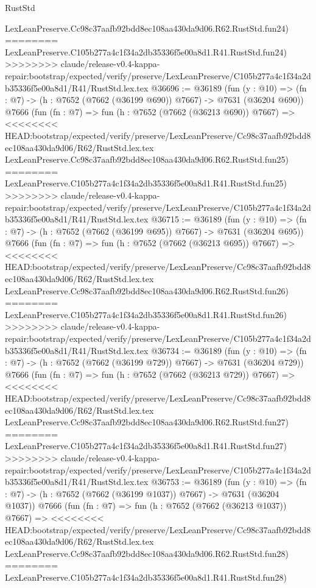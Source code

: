\begin{lexlean}{RustStd}
\begin{coremodule}
{\begin{coremodule}
{{{{{{{{{{{{{{{{{{{{{{{{{{{{{{{{{{{{{{{{{{{{{{{{{{{{{    LexLeanPreserve.Cc98c37aafb92bdd8ec108aa430da9d06.R62.RustStd.fun24)
========
    LexLeanPreserve.C105b277a4c1f34a2db35336f5e00a8d1.R41.RustStd.fun24)
>>>>>>>> claude/release-v0.4-kappa-repair:bootstrap/expected/verify/preserve/LexLeanPreserve/C105b277a4c1f34a2db35336f5e00a8d1/R41/RustStd.lex.tex
@36696 := @36189
    (fun (y : @10) => (fn : @7) -> (h : @7652 (@7662 (@36199 @690)) @7667) -> @7631 (@36204 @690))
    @7666
    (fun (fn : @7) =>
    fun (h : @7652 (@7662 (@36213 @690)) @7667) =>
<<<<<<<< HEAD:bootstrap/expected/verify/preserve/LexLeanPreserve/Cc98c37aafb92bdd8ec108aa430da9d06/R62/RustStd.lex.tex
    LexLeanPreserve.Cc98c37aafb92bdd8ec108aa430da9d06.R62.RustStd.fun25)
========
    LexLeanPreserve.C105b277a4c1f34a2db35336f5e00a8d1.R41.RustStd.fun25)
>>>>>>>> claude/release-v0.4-kappa-repair:bootstrap/expected/verify/preserve/LexLeanPreserve/C105b277a4c1f34a2db35336f5e00a8d1/R41/RustStd.lex.tex
@36715 := @36189
    (fun (y : @10) => (fn : @7) -> (h : @7652 (@7662 (@36199 @695)) @7667) -> @7631 (@36204 @695))
    @7666
    (fun (fn : @7) =>
    fun (h : @7652 (@7662 (@36213 @695)) @7667) =>
<<<<<<<< HEAD:bootstrap/expected/verify/preserve/LexLeanPreserve/Cc98c37aafb92bdd8ec108aa430da9d06/R62/RustStd.lex.tex
    LexLeanPreserve.Cc98c37aafb92bdd8ec108aa430da9d06.R62.RustStd.fun26)
========
    LexLeanPreserve.C105b277a4c1f34a2db35336f5e00a8d1.R41.RustStd.fun26)
>>>>>>>> claude/release-v0.4-kappa-repair:bootstrap/expected/verify/preserve/LexLeanPreserve/C105b277a4c1f34a2db35336f5e00a8d1/R41/RustStd.lex.tex
@36734 := @36189
    (fun (y : @10) => (fn : @7) -> (h : @7652 (@7662 (@36199 @729)) @7667) -> @7631 (@36204 @729))
    @7666
    (fun (fn : @7) =>
    fun (h : @7652 (@7662 (@36213 @729)) @7667) =>
<<<<<<<< HEAD:bootstrap/expected/verify/preserve/LexLeanPreserve/Cc98c37aafb92bdd8ec108aa430da9d06/R62/RustStd.lex.tex
    LexLeanPreserve.Cc98c37aafb92bdd8ec108aa430da9d06.R62.RustStd.fun27)
========
    LexLeanPreserve.C105b277a4c1f34a2db35336f5e00a8d1.R41.RustStd.fun27)
>>>>>>>> claude/release-v0.4-kappa-repair:bootstrap/expected/verify/preserve/LexLeanPreserve/C105b277a4c1f34a2db35336f5e00a8d1/R41/RustStd.lex.tex
@36753 := @36189
    (fun (y : @10) => (fn : @7) -> (h : @7652 (@7662 (@36199 @1037)) @7667) -> @7631 (@36204 @1037))
    @7666
    (fun (fn : @7) =>
    fun (h : @7652 (@7662 (@36213 @1037)) @7667) =>
<<<<<<<< HEAD:bootstrap/expected/verify/preserve/LexLeanPreserve/Cc98c37aafb92bdd8ec108aa430da9d06/R62/RustStd.lex.tex
    LexLeanPreserve.Cc98c37aafb92bdd8ec108aa430da9d06.R62.RustStd.fun28)
========
    LexLeanPreserve.C105b277a4c1f34a2db35336f5e00a8d1.R41.RustStd.fun28)
}}}}}}}}}}}}}}}}}}}}}}}}}}}}}}}}}}}}}}}}}}}}}}}}}}}}}
\end{coremodule}}
\end{coremodule}
\end{lexlean}
